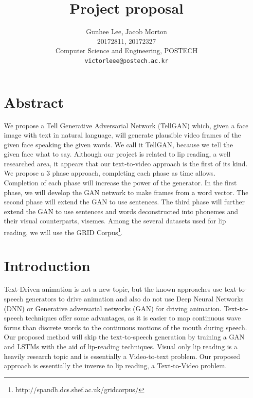\documentclass[10pt,twocolumn,letterpaper]{article}
\begin{document}
\title{Project proposal}

\author{Gunhee Lee, Jacob Morton\\
20172811, 20172327\\
Computer Science and Engineering, POSTECH\\
{\tt\small victorleee@postech.ac.kr}
}


\maketitle


\section{Abstract}

 We propose a Tell Generative Adversarial Network (TellGAN) which, given a face image with text in natural language, will generate plausible video frames of the given face speaking the given words. We call it TellGAN, because we tell the given face what to say. Although our project is related to lip reading, a well researched area, it appears that our text-to-video approach is the first of its kind. We propose a 3 phase approach, completing each phase as time allows. Completion of each phase will increase the power of the generator. In the first phase, we will develop the GAN network to make frames from a word vector. The second phase will extend the GAN to use sentences. The third phase will further extend the GAN to use sentences and words deconstructed into phonemes and their visual counterparts, visemes. Among the several datasets used for lip reading, we will use the GRID \cite{Authors14b} Corpus\footnote{http://spandh.dcs.shef.ac.uk/gridcorpus/}.
 
\section{Introduction}
 Text-Driven animation is not a new topic, but the known approaches use text-to-speech generators to drive animation and also do not use Deep Neural Networks (DNN) or Generative adversarial networks (GAN) for driving animation. Text-to-speech techniques offer some advantages, as it is easier to map continuous wave forms than discrete words to the continuous motions of the mouth during speech. Our proposed method will skip the text-to-speech generation by training a GAN and LSTMs with the aid of lip-reading techniques. Visual only lip reading is a heavily research topic and is essentially a Video-to-text problem. Our proposed approach is essentially the inverse to lip reading, a Text-to-Video problem.
\end{document}
